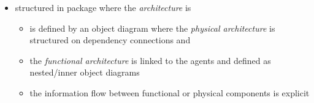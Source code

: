 \begin{itemize}
\item structured in package where the \emph{architecture} is
\begin{itemize}
\item is defined by an object diagram where the \emph{physical architecture} is structured on dependency connections and
\item the \emph{functional architecture} is linked to the agents and defined as nested/inner object diagrams
\item the information flow between functional or physical components is explicit 
\end{itemize}
\end{itemize}
